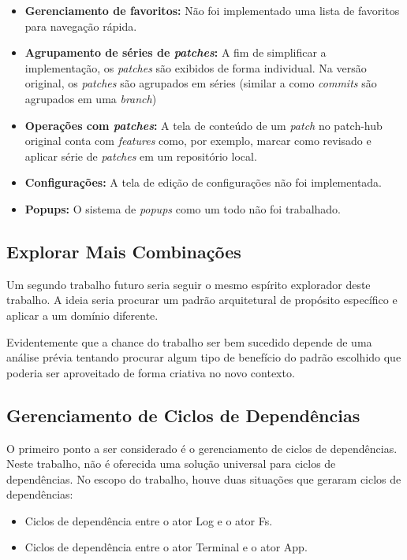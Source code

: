 \begin{itemize}
    \item \textbf{Gerenciamento de favoritos:} Não foi implementado uma lista de favoritos para navegação rápida.
    \item \textbf{Agrupamento de séries de \emph{patches}:} A fim de simplificar a implementação, os \emph{patches} são exibidos de forma individual. Na versão original, os \emph{patches} são agrupados em séries (similar a como \emph{commits} são agrupados em uma \emph{branch})
    \item \textbf{Operações com \emph{patches}:} A tela de conteúdo de um \emph{patch} no patch-hub original conta com \emph{features} como, por exemplo, marcar como revisado e aplicar série de \emph{patches} em um repositório local.
    \item \textbf{Configurações:} A tela de edição de configurações não foi implementada.
    \item \textbf{Popups:} O sistema de \emph{popups} como um todo não foi trabalhado.
\end{itemize}

\subsection{Explorar Mais Combinações}

Um segundo trabalho futuro seria seguir o mesmo espírito explorador deste trabalho. A ideia seria procurar um padrão arquitetural de propósito específico e aplicar a um domínio diferente.

Evidentemente que a chance do trabalho ser bem sucedido depende de uma análise prévia tentando procurar algum tipo de benefício do padrão escolhido que poderia ser aproveitado de forma criativa no novo contexto.

\subsection{Gerenciamento de Ciclos de Dependências}

O primeiro ponto a ser considerado é o gerenciamento de ciclos de dependências. Neste trabalho, não é oferecida uma solução universal para ciclos de dependências. No escopo do trabalho, houve duas situações que geraram ciclos de dependências:

\begin{itemize}
    \item Ciclos de dependência entre o ator Log e o ator Fs.
    \item Ciclos de dependência entre o ator Terminal e o ator App.
\end{itemize}

